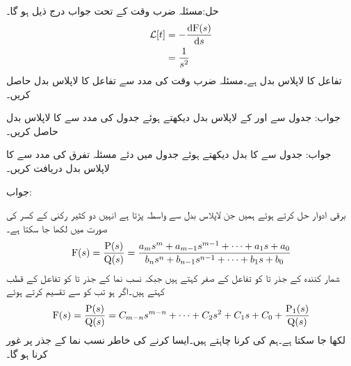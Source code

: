 حل:مسئلہ ضرب وقت کے تحت جواب درج ذیل ہو گا۔
\begin{align*}
\Laplace[t]&=-\frac{\dif \bF(s)}{\dif s}\\
&=\frac{1}{s^2}
\end{align*}
تفاعل  کا لاپلاس بدل  ہے۔مسئلہ ضرب وقت کی مدد سے تفاعل  کا لاپلاس بدل حاصل کریں۔

جواب:
جدول  سے  اور  کے لاپلاس بدل دیکھتے ہوئے جدول   کی مدد سے  کا لاپلاس بدل حاصل کریں۔

جواب:
جدول  سے  کا بدل دیکھتے ہوئے جدول   میں دئے مسئلہ تفرق کی مدد سے  کا لاپلاس بدل دریافت کریں۔

جواب:

برقی ادوار حل کرتے ہوئے ہمیں جن لاپلاس بدل سے واسطہ پڑتا ہے انہیں دو کثیر رکنی کے کسر کی صورت میں لکھا جا سکتا ہے۔
\begin{align}\label{مساوات_لاپلاس_عمومی_الف}
{\ensuremath{{\textup{F}}}}(s)=\frac{{{\textup{P}}}(s)}{{{\textup{Q}}}(s)}=\frac{a_m s^m+a_{m-1} s^{m-1}+\cdots+a_1 s+a_0}{b_n s^n+b_{n-1} s^{n-1}+\cdots+b_1 s+b_0}
\end{align}
شمار کنندہ  کے جذر  تا   کو تفاعل کے صفر کہتے ہیں جبکہ نسب نما  کے جذر   تا  کو تفاعل کے قطب کہتے ہیں۔اگر  ہو تب  کو  سے تقسیم کرتے ہوئے
\begin{align}\label{مساوات_لاپلاس_عمومی_ب}
{\ensuremath{{\textup{F}}}}(s)=\frac{{{\textup{P}}}(s)}{{{\textup{Q}}}(s)}=C_{m-n}s^{m-n}+\cdots+C_2 s^2+C_1 s+C_0+\frac{{{\textup{P}}}_1(s)}{{{\textup{Q}}}(s)}
\end{align}
لکھا جا سکتا ہے۔ہم  کی  کرنا چاہتے ہیں۔ایسا کرنے کی خاطر نسب نما  کے جذر پر غور کرنا ہو گا۔

